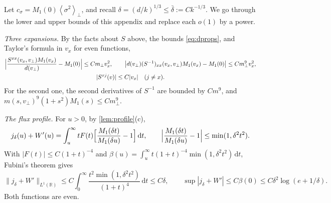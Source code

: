 \documentclass[11pt]{article}
\newcommand{\dd}{\,\mathrm d}
\newcommand{\av}[1]{\left\langle #1\right\rangle}
\newcommand{\RR}{\mathbb R}
\theoremstyle{definition}
\theoremstyle{remark}
\numberwithin{equation}{section}
\begin{document}
Let $c_\sigma=M_1(0)\av{\sigma^2}_\perp$, and recall
$\delta=(d/k)^{1/3}\leq\bar\delta:=Ck^{-1/3}$. We go through the lower and
upper bounds of this appendix and replace each $o(1)$ by a power.

\emph{Three expansions.} By the facts about $S$ above, the bounds
\eqref{eq:dprops}, and Taylor's formula in $v_x$ for even functions,
\begin{gather}
 \Bigl|\frac{S^{xx}(v_x,v_\perp)M_1(v_x)}{d(v_\perp)}-M_1(0)\Bigr|
   \leq Cm_\perp v_x^2,\qquad
 \bigl|d(v_\perp)(S^{-1})_{xx}(v_x,v_\perp)M_1(v_x)-M_1(0)\bigr|
   \leq Cm_\perp^9v_x^2,\nonumber\\
 |S^{xj}(v)|\leq C|v_x|\quad(j\ne x).
 \label{eq:rate-taylor}
\end{gather}
For the second one, the second derivatives of $S^{-1}$ are bounded by
$Cm^9$, and $m(s,v_\perp)^9(1+s^2)M_1(s)\leq Cm_\perp^9$.

\emph{The flux profile.} For $u>0$, by \cref{lem:profile}(c),
\[
 j_\delta(u)+W'(u)=\int_u^\infty tF(t)
   \Bigl[\frac{M_1(\delta t)}{M_1(\delta u)}-1\Bigr]\dd t,\qquad
 \Bigl|\frac{M_1(\delta t)}{M_1(\delta u)}-1\Bigr|\leq\min(1,\delta^2t^2).
\]
With $|F(t)|\leq C(1+t)^{-4}$ and
$\beta(u)=\int_u^\infty t(1+t)^{-4}\min(1,\delta^2t^2)\dd t$, Fubini's
theorem gives
\begin{equation}
 \|j_\delta+W'\|_{L^1(\RR)}\leq C\!\int_0^\infty\!\frac{t^2\min(1,\delta^2t^2)}
   {(1+t)^4}\dd t\leq C\delta,\qquad
 \sup|j_\delta+W'|\leq C\beta(0)\leq C\delta^2\log(e+1/\delta).
 \label{eq:rate-j}
\end{equation}
Both functions are even.
\end{document}
